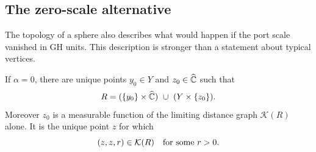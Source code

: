 \subsection{The zero-scale alternative}

The topology of a sphere also describes what would happen if the
port scale vanished in GH units.  This description is stronger than
a statement about typical vertices.

\begin{proposition}
\label{comp:concentration}
If $\alpha=0$, there are unique points $y_0\in Y$ and $z_0\in\widehat{\mathbb C}$
such that
\begin{equation}
 \label{comp:cross-relation}
 R=(\{y_0\}\times\Chat)\ \cup\ (Y\times\{z_0\}).
\end{equation}
Moreover $z_0$ is a measurable function of the limiting distance
graph $\mathcal K(R)$ alone.  It is the unique point $z$ for which
\begin{equation}
 \label{comp:positive-diagonal}
 (z,z,r)\in\mathcal K(R)\quad\hbox{for some }r>0.
\end{equation}
\end{proposition}

